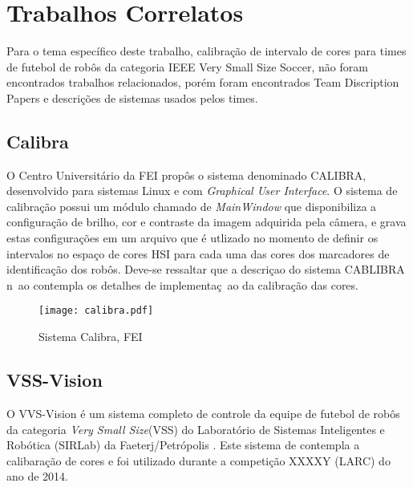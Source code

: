 \section{Trabalhos Correlatos}
Para o tema específico deste trabalho, calibração de intervalo de cores para times de futebol de robôs da categoria IEEE Very Small Size Soccer, não foram encontrados trabalhos relacionados, porém foram encontrados Team Discription Papers e descrições de sistemas usados pelos times\cite{Penharbel:2004}\cite{Rosa:2015}\cite{VSSVision}\cite{PenharbelTime}.

\subsection{Calibra}
O Centro Universitário da FEI propôs o sistema denominado CALIBRA, desenvolvido para sistemas Linux e com {\it Graphical User Interface}. O sistema de calibração possui um módulo chamado de {\it MainWindow} que disponibiliza a configuração de brilho, cor e contraste da imagem adquirida pela câmera, e grava estas configurações em um arquivo que é utlizado no momento de definir os intervalos no espaço de cores HSI para cada uma das cores dos marcadores de identificação dos robôs\cite{Penharbel:2004,PenharbelTime}. Deve-se ressaltar que a descriçao do sistema CABLIBRA n~ao contempla os detalhes de implementaç~ao da calibração das cores.
\begin{figure}[H]
	\centering
	\texttt{[image: calibra.pdf]}
	\caption{Sistema Calibra, FEI\cite{Penharbel:2004}}
	\label{Calibra}
\end{figure}

\subsection{VSS-Vision}

O VVS-Vision é um sistema completo de controle da equipe de futebol de robôs da categoria {\it Very Small Size}(VSS) do Laboratório de Sistemas Inteligentes e Robótica (SIRLab) da Faeterj/Petrópolis \cite{Rosa:2015}. Este sistema de contempla a calibaração de cores e foi utilizado durante a competição XXXXY (LARC) do ano de 2014.

